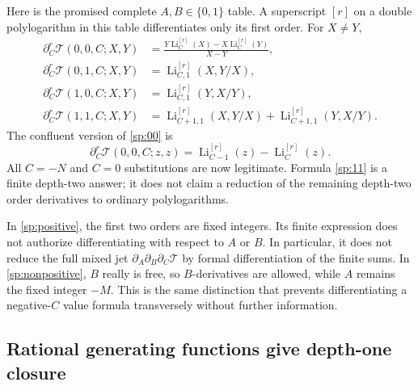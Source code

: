 Here is the promised complete $A,B\in\{0,1\}$ table.  A superscript
$[r]$ on a double polylogarithm in this table differentiates only its
first order.  For $X\ne Y$,
\begin{align}
 \partial_C^r\mathcal T(0,0,C;X,Y)
 &=\frac{Y\operatorname{Li}_{C}^{[r]}(X)
          -X\operatorname{Li}_{C}^{[r]}(Y)}{X-Y},
 \label{sp:00}\\
 \partial_C^r\mathcal T(0,1,C;X,Y)
 &=\operatorname{Li}_{C,1}^{[r]}(X,Y/X),\label{sp:01}\\
 \partial_C^r\mathcal T(1,0,C;X,Y)
 &=\operatorname{Li}_{C,1}^{[r]}(Y,X/Y),\label{sp:10}\\
 \partial_C^r\mathcal T(1,1,C;X,Y)
 &=\operatorname{Li}_{C+1,1}^{[r]}(X,Y/X)
   +\operatorname{Li}_{C+1,1}^{[r]}(Y,X/Y).
 \label{sp:11}
\end{align}
The confluent version of \eqref{sp:00} is
\begin{equation}\label{sp:00confluent}
 \partial_C^r\mathcal T(0,0,C;z,z)
 =\operatorname{Li}_{C-1}^{[r]}(z)
    -\operatorname{Li}_{C}^{[r]}(z).
\end{equation}
All $C=-N$ and $C=0$ substitutions are now legitimate.  Formula
\eqref{sp:11} is a finite depth-two answer; it does not claim a
reduction of the remaining depth-two order derivatives to ordinary
polylogarithms.

\begin{remark}
\label{sp:directionwarning}
In \eqref{sp:positive}, the first two orders are fixed integers.  Its
finite expression does not authorize differentiating with respect to
$A$ or $B$.  In particular, it does not reduce the full mixed jet
$\partial_A\partial_B\partial_C\mathcal T$ by formal differentiation
of the finite sums.  In \eqref{sp:nonpositive}, $B$ really is free,
so $B$-derivatives are allowed, while $A$ remains the fixed integer
$-M$.  This is the same distinction that prevents differentiating
a negative-$C$ value formula transversely without further information.
\end{remark}

\subsection{Rational generating functions give depth-one closure}

